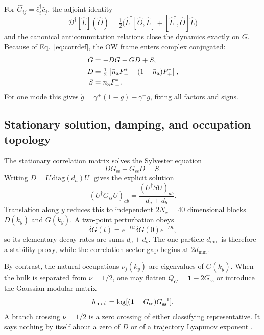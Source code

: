 \documentclass[aps,prb,twocolumn,nofootinbib,superscriptaddress,floatfix]{revtex4-2}
\newcommand{\Gss}{G_{\mathrm{ss}}}
\newcommand{\id}{\mathbf{1}}
\newcommand{\Diss}{\mathcal{D}}
\begin{document}
For $\hat G_{ij}=\hat c_i^\dagger\hat c_j$, the adjoint identity
\begin{equation}
 \Diss^\dagger[\hat L](\hat O)=\tfrac12\bigl(
 \hat L^\dagger[\hat O,\hat L]+[\hat L^\dagger,\hat O]\hat L\bigr)
 \label{eq:adjointidentity}
\end{equation}
and the canonical anticommutation relations close the dynamics exactly on
$G$. Because of Eq.~\eqref{eq:corrdef}, the OW frame enters complex
conjugated:
\begin{align}
 \dot G&=-DG-GD+S,\label{eq:correlation}\\
 D&=\tfrac12\left[\bar n_{\rm a}F_-^*
 +(1-\bar n_{\rm a})F_+^*\right],\nonumber\\
 S&=\bar n_{\rm a}F_-^*.
 \label{eq:DS}
\end{align}
For one mode this gives
$\dot g=\gamma^+(1-g)-\gamma^-g$, fixing all factors and signs.

\subsection{Stationary solution, damping, and occupation topology}

The stationary correlation matrix solves the Sylvester equation
\begin{equation}
 D\Gss+\Gss D=S.
 \label{eq:sylvester}
\end{equation}
Writing $D=U\,\mathrm{diag}(d_a)U^\dagger$ gives the explicit solution
\begin{equation}
 (U^\dagger\Gss U)_{ab}
 =\frac{(U^\dagger S U)_{ab}}{d_a+d_b}.
 \label{eq:stationarysolution}
\end{equation}
Translation along $y$ reduces this to independent $2N_x=40$ dimensional
blocks $D(k_y)$ and $G(k_y)$. A two-point perturbation obeys
\begin{equation}
 \delta G(t)=e^{-Dt}\delta G(0)e^{-Dt},
 \label{eq:homogeneous}
\end{equation}
so its elementary decay rates are sums $d_a+d_b$. The one-particle
$d_{\min}$ is therefore a stability proxy, while the correlation-sector gap begins
at $2d_{\min}$.

By contrast, the natural occupations $\nu_j(k_y)$ are eigenvalues of
$G(k_y)$. When the bulk is separated from $\nu=1/2$, one may flatten
$Q_G=\id-2\Gss$ or introduce the Gaussian modular matrix
\begin{equation}
 h_{\rm mod}=\log[(\id-\Gss)\Gss^{-1}].
\end{equation}
A branch crossing $\nu=1/2$ is a zero crossing of either classifying
representative. It says nothing by itself about a zero of $D$ or of a
trajectory Lyapunov exponent \cite{Mao2024,Lieu2020}.
\end{document}
